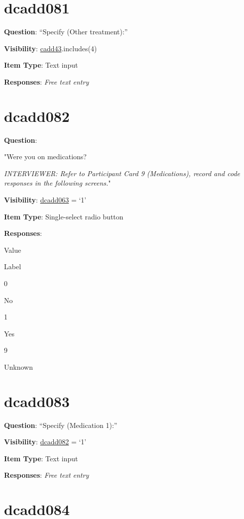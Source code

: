 \documentclass[]{book}
\begin{document}
\hypertarget{dcadd081}{%
\section{dcadd081}\label{dcadd081}}

\textbf{Question}: ``Specify (Other treatment):''

\textbf{Visibility}: \protect\hyperlink{cadd43}{cadd43}.includes(4)

\textbf{Item Type}: Text input

\textbf{Responses}: \emph{Free text entry}

\hypertarget{dcadd082}{%
\section{dcadd082}\label{dcadd082}}

\textbf{Question}:

"Were you on medications?

\emph{INTERVIEWER: Refer to Participant Card 9 (Medications), record and code responses in the following screens.}"

\textbf{Visibility}: \protect\hyperlink{dcadd063}{dcadd063} = `1'

\textbf{Item Type}: Single-select radio button

\textbf{Responses}:

Value

Label

0

No

1

Yes

9

Unknown

\hypertarget{dcadd083}{%
\section{dcadd083}\label{dcadd083}}

\textbf{Question}: ``Specify (Medication 1):''

\textbf{Visibility}: \protect\hyperlink{dcadd082}{dcadd082} = `1'

\textbf{Item Type}: Text input

\textbf{Responses}: \emph{Free text entry}

\hypertarget{dcadd084}{%
\section{dcadd084}\label{dcadd084}}
\end{document}
